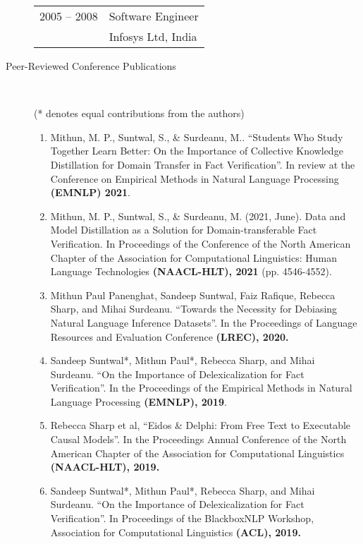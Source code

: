 \documentclass[10pt]{article}
\newcommand{\ti}[1]{``#1''} %
\begin{document}
\begin{description}
\begin{tabular}{lp{4.9in}}
\hspace{-.2cm}2005 -- 2008 & Software Engineer	\\
& {\sc Infosys Ltd, India} 

\end{tabular}







\item [ Peer-Reviewed Conference Publications]\


(* denotes equal contributions from the authors)

\begin{enumerate}

\item Mithun, M. P., Suntwal, S., \& Surdeanu, M..   \ti{Students Who Study Together Learn Better: On the Importance of Collective Knowledge Distillation for Domain Transfer in Fact Verification}. In review at  the Conference on Empirical Methods in Natural Language Processing \textbf{(EMNLP) 2021}.


\item Mithun, M. P., Suntwal, S., \& Surdeanu, M. (2021, June). Data and Model Distillation as a Solution for Domain-transferable Fact Verification. In Proceedings of the Conference of the North American Chapter of the Association for Computational Linguistics: Human Language Technologies \textbf{(NAACL-HLT), 2021} (pp. 4546-4552).

\item Mithun Paul Panenghat, Sandeep Suntwal, Faiz Rafique, Rebecca Sharp, and Mihai Surdeanu.   \ti{Towards the Necessity for Debiasing Natural Language Inference Datasets}.  In the Proceedings of Language Resources and Evaluation Conference \textbf{(LREC), 2020.}


\item Sandeep Suntwal*, Mithun Paul*, Rebecca Sharp, and Mihai Surdeanu.   \ti{On the Importance of Delexicalization for Fact Verification}. In the Proceedings of the Empirical Methods in Natural Language Processing \textbf{(EMNLP), 2019}.

\item  Rebecca Sharp et al,   \ti{Eidos \& Delphi: From Free Text to Executable Causal Models}. In the Proceedings Annual Conference of the North American Chapter of the Association for Computational Linguistics \textbf{(NAACL-HLT), 2019.}


\item Sandeep Suntwal*, Mithun Paul*, Rebecca Sharp, and Mihai Surdeanu.   \ti{On the Importance of Delexicalization for Fact Verification}. In Proceedings of the BlackboxNLP Workshop, Association for Computational Linguistics \textbf{(ACL), 2019.}


\end{enumerate}
\end{description}
\end{document}
